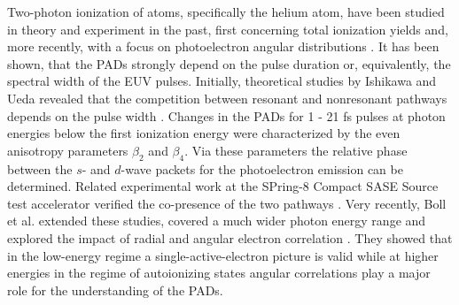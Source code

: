 Two-photon ionization of atoms, specifically the helium atom, have been studied in theory and experiment in the past, first concerning total ionization yields  \cite{nikolopoulos2001,vanderhart2005,shakeshaft2007,pi2010,florescu2011,sato2011,florescu2012} and, more recently, with a focus on photoelectron angular distributions \cite{ishikawa2012,ishikawa2013,ma2013,boll2019}. It has been shown, that the PADs strongly depend on the pulse duration or, equivalently, the spectral width of the EUV pulses. Initially, theoretical studies by Ishikawa and Ueda revealed that the competition between resonant and nonresonant pathways depends on the pulse width \cite{ishikawa2012,ishikawa2013}. Changes in the PADs for 1 - 21 fs pulses at photon energies below the first ionization energy were characterized by the even anisotropy parameters $\beta_2$ and $\beta_4$. Via these parameters the relative phase between the $s$- and $d$-wave packets for the photoelectron emission can be determined. Related experimental work at the SPring-8 Compact SASE Source test accelerator verified the co-presence of the two pathways \cite{ma2013}. Very recently, Boll et al. extended these studies, covered a much wider photon energy range and explored the impact of radial and angular electron correlation \cite{boll2019}. They showed that in the low-energy regime
a single-active-electron picture is valid while at higher energies in the regime of autoionizing states angular correlations play a major role for the understanding of the PADs.

